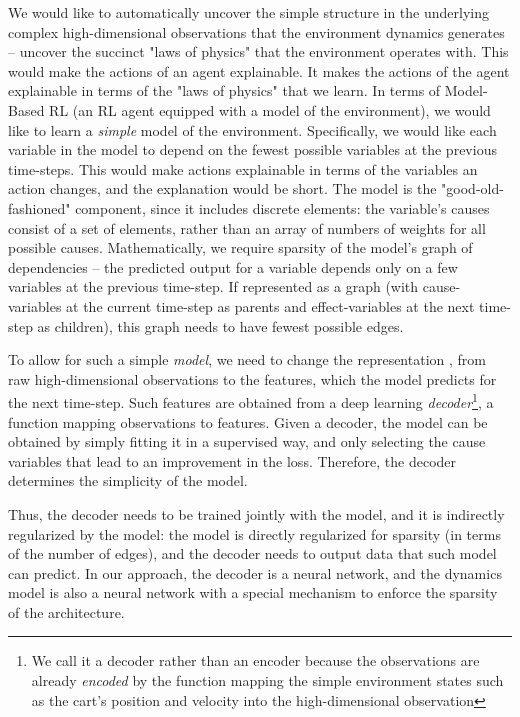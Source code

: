 \documentclass[a4paper,11pt,oneside]{report}
\begin{document}
We would like to automatically uncover the simple structure in the underlying complex high-dimensional observations that the environment dynamics generates -- uncover the succinct "laws of physics" \cite{Bakhtin2019} that the environment operates with.
This would make the actions of an agent explainable.
It makes the actions of the agent explainable in terms of the "laws of physics" that we learn. In terms of Model-Based RL \cite{DeBruin2018,Corneil2018,Kaiser2019} (an RL agent equipped with a model of the environment), we would like to learn a {\em simple} model of the environment.
Specifically, we would like each variable in the model to depend on the fewest possible variables at the previous time-steps. This would make actions explainable in terms of the variables an action changes, and the explanation would be short. The model is the "good-old-fashioned" component, since it includes discrete elements: the variable's causes consist of a set of elements, rather than an array of numbers of weights for all possible causes.
Mathematically, we require sparsity of the model's graph of dependencies -- the predicted output for a variable depends only on a few variables at the previous time-step. If represented as a graph (with cause-variables at the current time-step as parents and effect-variables at the next time-step as children), this graph needs to have fewest possible edges.

To allow for such a simple {\em model}, we need to change the representation \cite{Kamalaruban}, from raw high-dimensional observations to the features, which the model predicts for the next time-step. Such features are obtained from a deep learning {\em decoder}\footnote{We call it a decoder rather than an encoder because the observations are already {\em encoded} by the function mapping the simple environment states such as the cart's position and velocity into the high-dimensional observation}, a function mapping observations to features. Given a decoder, the model can be obtained by simply fitting it in a supervised way, and only selecting the cause variables that lead to an improvement in the loss. Therefore, the decoder determines the simplicity of the model.

Thus, the decoder needs to be trained jointly with the model, and it is indirectly regularized by the model: the model is directly regularized for sparsity (in terms of the number of edges), and the decoder needs to output data that such model can predict.
In our approach, the decoder is a neural network, and the dynamics model is also a neural network with a special mechanism to enforce the sparsity of the architecture.
\end{document}
